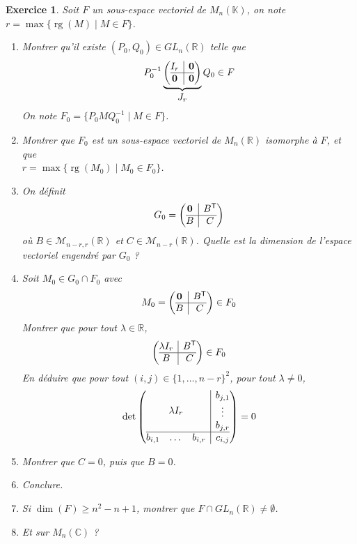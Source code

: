 \documentclass[12pt]{article}
\newtheorem{exercise}{Exercice}[section]
\theoremstyle{remark}
\theoremstyle{remark}
\newcommand{\K}{\mathbb{K}}
\newcommand{\R}{\mathbb{R}}
\newcommand{\C}{\mathbb{C}}
\newcommand{\M}{\mathcal{M}}
\DeclareMathOperator{\rg}{rg}
\newcommand{\bigzero}{\mbox{\normalfont\bfseries 0}}
\begin{document}
\begin{exercise}
	Soit $F$ un sous-espace vectoriel de $M_{n}(\K)$, on note
	$r=\max\{\rg(M)\mid M\in F \}$.
	\begin{enumerate}
		\item Montrer qu'il existe $(P_{0},Q_{0})\in GL_{n}(\R)$ telle que 
		$$
		P_{0}^{-1}
		\underbrace{
			\left(
				\begin{array}{@{}c|c@{}}
					I_{r}
					& \bigzero \\
					\hline
					\bigzero &
					\bigzero
				\end{array}\right)
		}_{\displaystyle J_{r}}
		Q_{0}\in F
		$$
		On note $F_{0}=\{P_{0}MQ_{0}^{-1}\mid M\in F\}$.
		\item Montrer que $F_{0}$ est un sous-espace vectoriel de $M_{n}(\R)$
		isomorphe à $F$, et que \\$r=\max\{\rg(M_{0})\mid M_{0}\in F_{0}\}$.
		\item On définit 
		$$G_{0}=
		\left(
				\begin{array}{@{}c|c@{}}
					\bigzero
					& B^{\mathsf{T}} \\
					\hline
					B &
					C
				\end{array}\right)
		$$
		où $B\in\M_{n-r,r}(\R)$ et $C\in\M_{n-r}(\R)$. Quelle est la dimension de l'espace vectoriel engendré par $G_{0}$ ?
		\item Soit $M_{0}\in G_{0}\cap F_{0}$ avec 
		$$
			M_{0}=
			\left(
				\begin{array}{@{}c|c@{}}
					\bigzero
					& B^{\mathsf{T}} \\
					\hline
					B &
					C
				\end{array}
			\right)
			\in F_{0}
		$$
		Montrer que pour tout $\lambda\in\R$,
		$$
			\left(
				\begin{array}{@{}c|c@{}}
					\lambda I_{r}
					& B^{\mathsf{T}} \\
					\hline
					B &
					C
				\end{array}
			\right)
			\in F_{0}
		$$
		En déduire que pour tout $(i,j)\in\{1,\dots, n-r\}^{2}$, pour tout $\lambda\neq0$,
		$$
		\det\left(
				\begin{array}{@{}c|c@{}}
					\lambda I_{r}
					& \begin{matrix}
						b_{j,1}\\
						\vdots\\
						b_{j,r}
					\end{matrix} \\
					\hline
					\begin{matrix}
						b_{i,1} & \dots & b_{i,r}
					\end{matrix} &
					c_{i,j}
				\end{array}
			\right)=0
		$$
		\item Montrer que $C=0$, puis que $B=0$.
		\item Conclure.
		\item Si $\dim(F)\geqslant n^{2}-n+1$, montrer que $F\cap GL_{n}(\R)\neq\emptyset$.
		\item Et sur $M_{n}(\C)$ ?
	\end{enumerate}
\end{exercise}
\end{document}
